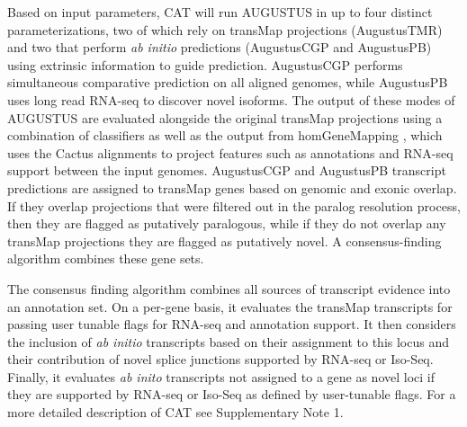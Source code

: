 \documentclass[fleqn,10pt]{wlscirep}
\begin{document}
Based on input parameters, CAT will run AUGUSTUS in up to four distinct parameterizations, two of which rely on transMap projections (AugustusTMR) and two that perform \textit{ab initio} predictions (AugustusCGP and AugustusPB) using extrinsic information to guide prediction. AugustusCGP performs simultaneous comparative prediction  \citep{konig2015simultaneous} on all aligned genomes, while AugustusPB uses long read RNA-seq to discover novel isoforms. The output of these modes of AUGUSTUS are evaluated alongside the original transMap projections using a combination of classifiers as well as the output from homGeneMapping  \citep{stanke2004augustus}, which uses the Cactus alignments to project features such as annotations and RNA-seq support between the input genomes. AugustusCGP and AugustusPB transcript predictions are assigned to transMap genes based on genomic and exonic overlap. If they overlap projections that were filtered out in the paralog resolution process, then they are flagged as putatively paralogous, while if they do not overlap any transMap projections they are flagged as putatively novel. A consensus-finding algorithm combines these gene sets.

The consensus finding algorithm combines all sources of transcript evidence into an annotation set. On a per-gene basis, it evaluates the transMap transcripts for passing user tunable flags for RNA-seq and annotation support. It then considers the inclusion of \textit{ab initio} transcripts based on their assignment to this locus and their contribution of novel splice junctions supported by RNA-seq or Iso-Seq. Finally, it evaluates \textit{ab inito} transcripts not assigned to a gene as novel loci if they are supported by RNA-seq or Iso-Seq as defined by user-tunable flags. For a more detailed description of CAT see Supplementary Note 1.
\end{document}
